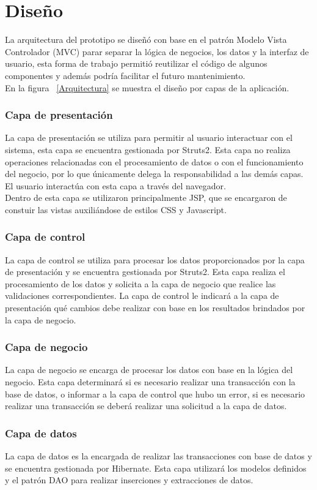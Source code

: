 \section{Diseño}
La arquitectura del prototipo se diseñó con base en el patrón Modelo Vista Controlador (MVC) parar separar la lógica de negocios, los datos y la interfaz de usuario, esta forma de trabajo permitió reutilizar el código de algunos componentes y además podría facilitar el futuro mantenimiento.\\

En la figura ~\ref{Arquitectura} se muestra el diseño por capas de la aplicación.


\subsubsection{Capa de presentación}

La capa de presentación se utiliza para permitir al usuario interactuar con el sistema, esta capa se encuentra gestionada por Struts2. Esta capa no realiza operaciones relacionadas con el procesamiento de datos o con el funcionamiento del negocio, por lo que únicamente delega la responsabilidad a las demás capas. El usuario interactúa con esta capa a través del navegador.\\
Dentro de esta capa se utilizaron principalmente JSP, que se encargaron de constuir las vistas auxiliándose de estilos CSS y Javascript.

\subsubsection{Capa de control}

La capa de control se utiliza para procesar los datos proporcionados por la capa de presentación y se encuentra gestionada por Struts2. Esta capa realiza el procesamiento de los datos y solicita a la capa de negocio que realice las validaciones correspondientes. La capa de control le indicará a la capa de presentación qué cambios debe realizar con base en los resultados brindados por la capa de negocio. 

\subsubsection{Capa de negocio}

La capa de negocio se encarga de procesar los datos con base en la lógica del negocio. Esta capa determinará si es necesario realizar una transacción con la base de datos, o  informar a la capa de control que hubo un error, si es necesario realizar una transacción se deberá realizar una solicitud a la capa de datos.

\subsubsection{Capa de datos}

La capa de datos es la encargada de realizar las transacciones con base de datos y se encuentra gestionada por Hibernate. Esta capa utilizará los modelos definidos y el patrón DAO para realizar inserciones y extracciones de datos.








